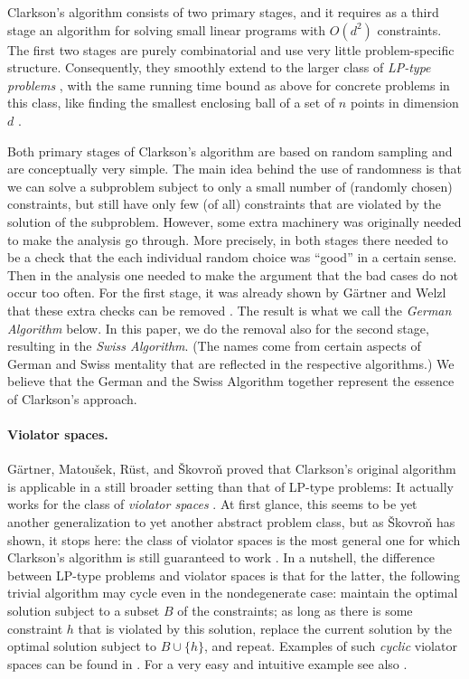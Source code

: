 \documentclass[12pt]{article}
\theoremstyle{remark}
\begin{document}
Clarkson's algorithm consists of two primary stages, and it requires
as a third stage an algorithm for solving small linear programs with
$O(d^2)$ constraints. The first two stages are purely combinatorial and use
very little problem-specific structure.  Consequently, they smoothly
extend to the larger class of \emph{LP-type problems} \cite{MSW},
with the same running time bound as above for concrete problems in this
class, like finding the smallest enclosing ball of a set of $n$ points
in dimension $d$ \cite{GaerWel1}.

Both primary stages of Clarkson's algorithm are based on random sampling and
are conceptually very simple. The main idea behind the use of randomness
is that we can solve a subproblem subject to only a small number of
(randomly chosen) constraints, but still have only few (of all) constraints
that are violated by the solution of the subproblem.
 However, some extra machinery was
originally needed to make the analysis go through.  More precisely,
in both stages there needed to be a check that the each individual
random choice was ``good'' in a certain sense. Then in the analysis
one needed to make the argument that the bad cases do not
occur too often. For the first
stage, it was already shown by G\"artner and Welzl that these extra checks
 can be removed \cite{GWSampl01}. The result is what we call
the \emph{German Algorithm} below. In this paper, we do the removal
also for the second stage, resulting in the \emph{Swiss Algorithm}.
(The names come from certain aspects of German and Swiss mentality
that are reflected in the respective algorithms.) We believe that the
German and the Swiss Algorithm together represent the essence of
Clarkson's approach.

\paragraph{Violator spaces.}
G\"artner, Matou\v{s}ek, R\"ust, and \v{S}kovro\v{n} proved that
Clarkson's original algorithm is applicable in a still broader setting
than that of LP-type problems: It actually works for the class of
\emph{violator spaces} \cite{journals/dam/GartnerMRS08}. At first
glance, this seems to be yet another generalization to yet another
abstract problem class, but as \v{S}kovro\v{n} has shown, it stops
here: the class of violator spaces is the most general one for which
Clarkson's algorithm is still guaranteed to work \cite{skovronP}. In a
nutshell, the difference between LP-type problems and violator spaces
is that for the latter, the following trivial algorithm may cycle even
in the nondegenerate case: maintain the optimal solution subject to a
subset $B$ of the constraints; as long as there is some constraint $h$
that is violated by this solution, replace the current solution by the
optimal solution subject to $B\cup\{h\}$, and repeat. Examples of
such \emph{cyclic} violator spaces can be found in \cite{skovronP}.
For a very easy and intuitive example see also  \cite{journals/dam/GartnerMRS08}.
\end{document}
